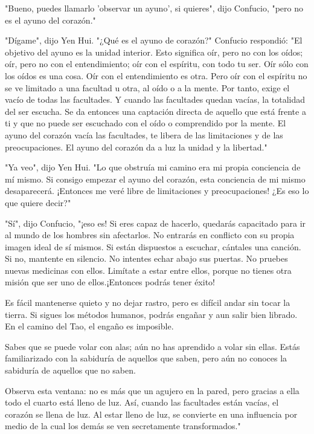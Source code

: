 "Bueno, puedes llamarlo 'observar un ayuno', si quieres", dijo Confucio,
"pero no es el ayuno del corazón."

"Dígame", dijo Yen Hui. "¿Qué es el ayuno de corazón?" Confucio
respondió: "El objetivo del ayuno es la unidad interior. Esto significa
oír, pero no con los oídos; oír, pero no con el entendimiento; oír con
el espíritu, con todo tu ser. Oír sólo con los oídos es una cosa. Oír
con el entendimiento es otra. Pero oír con el espíritu no se ve limitado
a una facultad u otra, al oído o a la mente. Por tanto, exige el vacío
de todas las facultades. Y cuando las facultades quedan vacías, la
totalidad del ser escucha. Se da entonces una captación directa de
aquello que está frente a ti y que no puede ser escuchado con el oído o
comprendido por la mente. El ayuno del corazón vacía las facultades, te
libera de las limitaciones y de las preocupaciones. El ayuno del corazón
da a luz la unidad y la libertad."

"Ya veo", dijo Yen Hui. "Lo que obstruía mi camino era mi propia
conciencia de mí mismo. Si consigo empezar el ayuno del corazón, esta
conciencia de mi mismo desaparecerá. ¡Entonces me veré libre de
limitaciones y preocupaciones! ¿Es eso lo que quiere decir?"

"Sí", dijo Confucio, "¡eso es! Si eres capaz de hacerlo, quedarás
capacitado para ir al mundo de los hombres sin afectarlos. No entrarás
en conflicto con su propia imagen ideal de sí mismos. Si están
dispuestos a escuchar, cántales una canción. Si no, mantente en
silencio. No intentes echar abajo sus puertas. No pruebes nuevas
medicinas con ellos. Limítate a estar entre ellos, porque no tienes otra
misión que ser uno de ellos.¡Entonces podrás tener éxito!

Es fácil mantenerse quieto y no dejar rastro, pero es difícil andar sin
tocar la tierra. Si sigues los métodos humanos, podrás engañar y aun
salir bien librado. En el camino del Tao, el engaño es imposible.

Sabes que se puede volar con alas; aún no has aprendido a volar sin
ellas. Estás familiarizado con la sabiduría de aquellos que saben, pero
aún no conoces la sabiduría de aquellos que no saben.

Observa esta ventana: no es más que un agujero en la pared, pero gracias
a ella todo el cuarto está lleno de luz. Así, cuando las facultades
están vacías, el corazón se llena de luz. Al estar lleno de luz, se
convierte en una influencia por medio de la cual los demás se ven
secretamente transformados."

